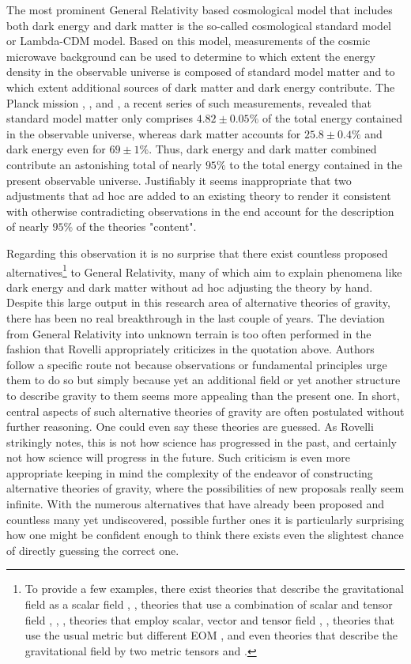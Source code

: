 The most prominent General Relativity based cosmological model that includes both dark energy and dark matter is the so-called cosmological standard model or Lambda-CDM model. Based on this model, measurements of the cosmic microwave background can be used to determine to which extent the energy density in the observable universe is composed of standard model matter and to which extent additional sources of dark matter and dark energy contribute. The Planck mission \cite{Planck13_1}, \cite{Planck13_2}, \cite{Planck15} and \cite{Planck18}, a recent series of such measurements, revealed that standard model matter only comprises $4.82\pm0.05\%$ of the total energy contained in the observable universe, whereas dark matter accounts for $ 25.8\pm0.4\%$ and dark energy even for $ 69 \pm 1 \%$. Thus, dark energy and dark matter combined contribute an astonishing total of nearly $95 \%$ to the total energy contained in the present observable universe.
Justifiably it seems inappropriate that two adjustments that ad hoc are added to an existing theory to render it consistent with otherwise contradicting observations in the end account for the description of nearly $95\%$ of the theories "content".  

Regarding this observation it is no surprise that there exist countless proposed alternatives\footnote{To provide a few examples, there exist theories that describe the gravitational field as a scalar field \cite{Scalar1}, \cite{Scalar2}, theories that use a combination of scalar and tensor field \cite{ST1}, \cite{ST2}, \cite{ST3}, theories that employ scalar, vector and tensor field \cite{SVT1}, \cite{SVT2}, theories that use the usual metric but different EOM \cite{fR1}, \cite{fR2} and even theories that describe the gravitational field by two metric tensors \cite{BIM1} and \cite{BIM2}.} to General Relativity, many of which aim to explain phenomena like dark energy and dark matter without ad hoc adjusting the theory by hand. 
Despite this large output in this research area of alternative theories of gravity, there has been no real breakthrough in the last couple of years. 
The deviation from General Relativity into unknown terrain is too often performed in the fashion that Rovelli appropriately criticizes in the quotation above. Authors follow a specific route not because observations or fundamental principles urge them to do so but simply because yet an additional field or yet another structure to describe gravity to them seems more appealing than the present one. In short, central aspects of such alternative theories of gravity are often postulated without further reasoning. One could even say these theories are guessed. As Rovelli strikingly notes, this is not how science has progressed in the past, and certainly not how science will progress in the future. Such criticism is even more appropriate keeping in mind the complexity of the endeavor of constructing alternative theories of gravity, where the possibilities of new proposals really seem infinite.
With the numerous alternatives that have already been proposed and countless many yet undiscovered, possible further ones it is particularly surprising how one might be confident enough to think there exists even the slightest chance of directly guessing the correct one. 

